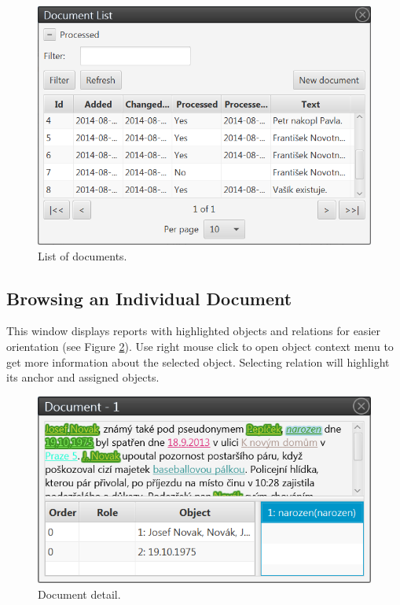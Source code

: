 \begin{figure}[!htb]
        \centering
        \includegraphics[width=\textwidth]{Images/documentlist}
        \caption{List of documents.}
        \label{fig:DocumentList}
\end{figure}

\subsection{Browsing an Individual Document}
\label{sssec:DocumentView}

This window displays reports with highlighted objects and relations for easier
orientation (see Figure \ref{fig:DocumentView}). Use right mouse click to open
object context menu to get more information about the selected object. Selecting
relation will highlight its anchor and assigned objects.

\begin{figure}[!htb]
        \centering
        \includegraphics[width=\textwidth]{Images/documentview}
        \caption{Document detail.}
        \label{fig:DocumentView}
\end{figure}

